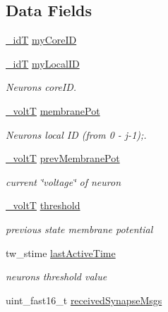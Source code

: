 \subsection*{Data Fields}
\begin{DoxyCompactItemize}
\item 
\hyperlink{assist_8h_a3f7a6e6a1210b6d9d7a42177dcb9634b}{\+\_\+id\+T} \hyperlink{structneuron_state_a76ef99e5766b6e36c3f41a2920e8c56c}{my\+Core\+I\+D}
\item 
\hyperlink{assist_8h_a3f7a6e6a1210b6d9d7a42177dcb9634b}{\+\_\+id\+T} \hyperlink{structneuron_state_ac24762c24aede292a2ce5df78114881c}{my\+Local\+I\+D}
\begin{DoxyCompactList}\small\item\em Neuron\textquotesingle{}s core\+I\+D. \end{DoxyCompactList}\item 
\hyperlink{assist_8h_abe1fc1b8f9efd1187e564bcb8de7f815}{\+\_\+volt\+T} \hyperlink{structneuron_state_a0fdd8f44c4105a94e17c4c58a51db486}{membrane\+Pot}
\begin{DoxyCompactList}\small\item\em Neuron\textquotesingle{}s local I\+D (from 0 -\/ j-\/1);. \end{DoxyCompactList}\item 
\hyperlink{assist_8h_abe1fc1b8f9efd1187e564bcb8de7f815}{\+\_\+volt\+T} \hyperlink{structneuron_state_ad17e1ac0b4bca75d10da8b0ab56edd6e}{prev\+Membrane\+Pot}
\begin{DoxyCompactList}\small\item\em current \char`\"{}voltage\char`\"{} of neuron \end{DoxyCompactList}\item 
\hyperlink{assist_8h_abe1fc1b8f9efd1187e564bcb8de7f815}{\+\_\+volt\+T} \hyperlink{structneuron_state_af321d0fa58028b78986160845189077e}{threshold}
\begin{DoxyCompactList}\small\item\em previous state membrane potential \end{DoxyCompactList}\item 
tw\+\_\+stime \hyperlink{structneuron_state_a0658ad1f8b57a00589c6ea84f9a4ab13}{last\+Active\+Time}
\begin{DoxyCompactList}\small\item\em neuron\textquotesingle{}s threshold value \end{DoxyCompactList}\item 
uint\+\_\+fast16\+\_\+t \hyperlink{structneuron_state_af8935bcba177f2f3dfb9119c39ef7dc5}{received\+Synapse\+Msgs}

\end{DoxyCompactItemize}
